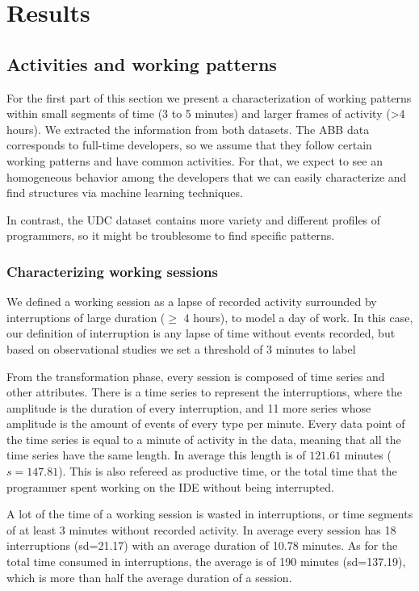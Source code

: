 \chapter{Results}
\label{ch:intro}

\section{Activities and working patterns}
For the first part of this section we present a characterization of working patterns within small segments of time (3 to 5 minutes) and larger frames of activity (>4 hours). We extracted  the information from both datasets. The ABB data corresponds to full-time developers, so we assume that they follow certain working patterns and have common activities. For that, we expect to see an homogeneous behavior among the developers that we can easily characterize and find structures via machine learning techniques.

In contrast, the UDC dataset contains more variety and different profiles of programmers, so it might be troublesome to find specific patterns.

\subsection{Characterizing working sessions}
We defined a working session as a lapse of recorded activity surrounded by interruptions of large duration ($\geq$ 4 hours), to model a day of work. In this case, our definition of interruption is any lapse of time without events recorded, but based on observational studies we set a threshold of 3 minutes to label

From the transformation phase, every session is composed of time series and other attributes. There is a time series to represent the interruptions, where the amplitude is the duration of every interruption, and 11 more series whose amplitude is the amount of events of every type per minute. Every data point of the time series is equal to a minute of activity in the data, meaning that all the time series have the same length. In average this length is of $121.61$ minutes ($s=147.81$). This is also refereed as productive time, or the total time that the programmer spent working on the IDE without being interrupted.

A lot of the time of a working session is wasted in interruptions, or time segments of at least 3 minutes without recorded activity. In average every session has 18 interruptions (sd=21.17) with an average duration of 10.78 minutes. As for the total time consumed in interruptions, the average is of 190 minutes (sd=137.19), which is more than half the average duration of a session.

